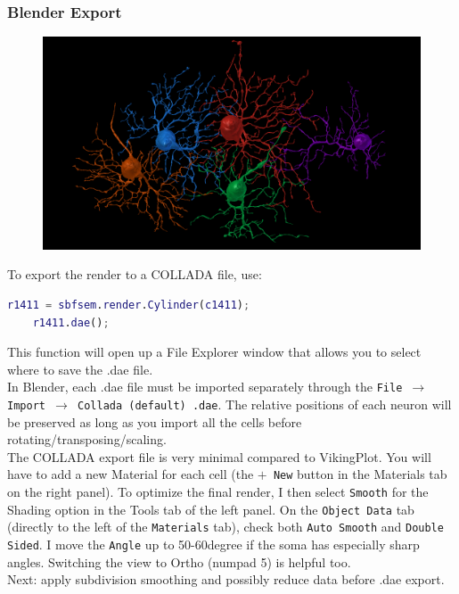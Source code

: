 \documentclass[12pt]{exam}
\begin{document}
	\subsubsection{Blender Export}
	\begin{figure}
		\includegraphics[width=\linewidth]{parasolRGCs}
		\label{blenderParasol}
	\end{figure}
	To export the render to a COLLADA file, use:
	\begin{lstlisting}[language=matlab]
	r1411 = sbfsem.render.Cylinder(c1411);
	r1411.dae();\end{lstlisting}
	This function will open up a File Explorer window that allows you to select where to save the .dae file.\\

	In Blender, each .dae file must be imported separately through the \texttt{File $\rightarrow$ Import $\rightarrow$ Collada (default) .dae}. The relative positions of each neuron will be preserved as long as you import all the cells before rotating/transposing/scaling.\\
	The COLLADA export file is very minimal compared to VikingPlot. You will have to add a new Material for each cell (the \texttt{$+$ New} button in the Materials tab on the right panel). To optimize the final render, I then select \texttt{Smooth} for the Shading option in the Tools tab of the left panel. On the \texttt{Object Data} tab (directly to the left of the \texttt{Materials} tab), check both \texttt{Auto Smooth} and \texttt{Double Sided}. I move the \texttt{Angle} up to 50-60\si{degree} if the soma has especially sharp angles. Switching the view to Ortho (numpad 5) is helpful too.\\
	Next: apply subdivision smoothing and possibly reduce data before .dae export.
\end{document}
